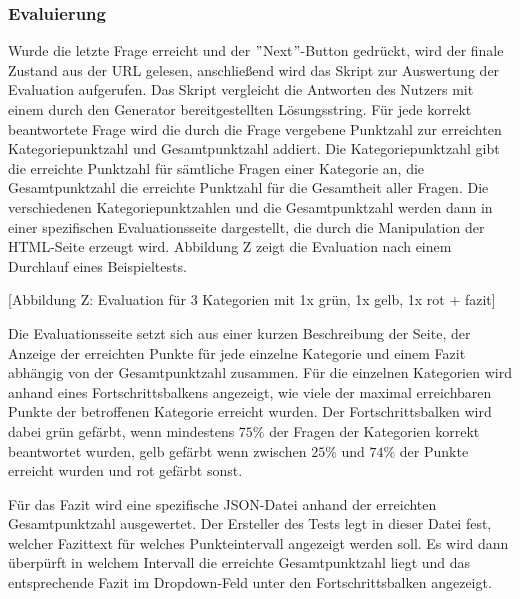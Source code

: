 \subsubsection{Evaluierung}

Wurde die letzte Frage erreicht und der $"$Next$"$-Button gedrückt, wird der finale Zustand aus der URL gelesen, anschließend wird das Skript zur Auswertung der Evaluation aufgerufen. Das Skript vergleicht die Antworten des Nutzers mit einem durch den Generator bereitgestellten Lösungsstring. Für jede korrekt beantwortete Frage wird die durch die Frage vergebene Punktzahl zur erreichten Kategoriepunktzahl und Gesamtpunktzahl addiert. Die Kategoriepunktzahl gibt die erreichte Punktzahl für sämtliche Fragen einer Kategorie an, die Gesamtpunktzahl die erreichte Punktzahl für die Gesamtheit aller Fragen. Die verschiedenen Kategoriepunktzahlen und die Gesamtpunktzahl werden dann in einer spezifischen Evaluationsseite dargestellt, die durch die Manipulation der HTML-Seite erzeugt wird. Abbildung Z zeigt die Evaluation nach einem Durchlauf eines Beispieltests. 

[Abbildung Z: Evaluation für 3 Kategorien mit 1x grün, 1x gelb, 1x rot + fazit]

Die Evaluationsseite setzt sich aus einer kurzen Beschreibung der Seite, der Anzeige der erreichten Punkte für jede einzelne Kategorie und einem Fazit abhängig von der Gesamtpunktzahl zusammen. Für die einzelnen Kategorien wird anhand eines Fortschrittsbalkens angezeigt, wie viele der maximal erreichbaren Punkte der betroffenen Kategorie erreicht wurden. Der Fortschrittsbalken wird dabei grün gefärbt, wenn mindestens $75\%$ der Fragen der Kategorien korrekt beantwortet wurden, gelb gefärbt wenn zwischen $25\%$ und $74\%$ der Punkte erreicht wurden und rot gefärbt sonst.

Für das Fazit wird eine spezifische JSON-Datei anhand der erreichten Gesamtpunktzahl ausgewertet. Der Ersteller des Tests legt in dieser Datei fest, welcher Fazittext für welches Punkteintervall angezeigt werden soll. Es wird dann überpürft in welchem Intervall die erreichte Gesamtpunktzahl liegt und das entsprechende Fazit im Dropdown-Feld unter den Fortschrittsbalken angezeigt. 






